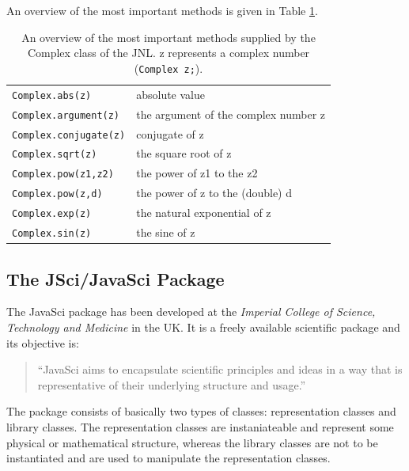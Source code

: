 An overview of the most important methods is given in Table 
\ref{tab:JNLComplex}.
\begin{table}[htbp]
  \begin{center}
    \begin{tabular}{l|l}
      \verb|Complex.abs(z)| & absolute value \\
      \verb|Complex.argument(z)| & the argument of the complex number z \\
      \verb|Complex.conjugate(z)| & conjugate of z  \\
      \verb|Complex.sqrt(z)| & the square root of z \\
      \verb|Complex.pow(z1,z2)| & the power of z1 to the z2\\
      \verb|Complex.pow(z,d)| & the power of z to the (double) d\\
      \verb|Complex.exp(z)| & the natural exponential of z \\
      \verb|Complex.sin(z)| & the sine of z \\
    \end{tabular}
    \caption{An overview of the most important methods supplied by the 
      Complex class of the JNL. z represents a complex number 
      (\texttt{Complex z;}).}
    \label{tab:JNLComplex}
  \end{center}
\end{table}


\subsection{The JSci/JavaSci Package}
\label{sec:JSci}
The JavaSci package has been developed at the
\emph{Imperial College of Science, Technology and Medicine} in the UK.
It is a freely available scientific package and its objective is:
\begin{quote}
``JavaSci aims to encapsulate scientific principles and ideas in a way 
that is representative of their underlying structure and usage.''
\end{quote}

The package consists of basically two types of classes: representation 
classes and library classes. The representation classes are instaniateable
and represent some physical or mathematical structure, whereas the
library classes are not to be instantiated and are used to manipulate
the representation classes.

